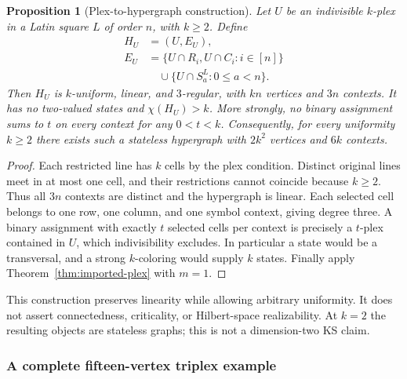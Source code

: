 \documentclass[aps,pra,reprint,superscriptaddress,longbibliography,nofootinbib,floatfix,10pt]{revtex4-2}
\newtheorem{proposition}[theorem]{Proposition}
\theoremstyle{definition}\newtheorem{definition}[theorem]{Definition}
\theoremstyle{remark}\newtheorem{remark}[theorem]{Remark}
\begin{document}
\begin{proposition}[Plex-to-hypergraph construction]\label{prop:plex-hypergraph}
Let $U$ be an indivisible $k$-plex in a Latin square $L$ of order $n$, with $k\ge2$. Define
\begin{equation}\label{eq:plex-contexts}
\begin{aligned}
H_U&=(U,E_U),\\
E_U&=\{U\cap R_i,U\cap C_i:i\in[n]\}\\
&\quad\cup\{U\cap S_a^L:0\le a<n\}.
\end{aligned}
\end{equation}
Then $H_U$ is $k$-uniform, linear, and $3$-regular, with $kn$ vertices and $3n$ contexts. It has no two-valued states and $\chi(H_U)>k$. More strongly, no binary assignment sums to $t$ on every context for any $0<t<k$. Consequently, for every uniformity $k\ge2$ there exists such a stateless hypergraph with $2k^2$ vertices and $6k$ contexts.
\end{proposition}
\begin{proof}
Each restricted line has $k$ cells by the plex condition. Distinct original lines meet in at most one cell, and their restrictions cannot coincide because $k\ge2$. Thus all $3n$ contexts are distinct and the hypergraph is linear. Each selected cell belongs to one row, one column, and one symbol context, giving degree three. A binary assignment with exactly $t$ selected cells per context is precisely a $t$-plex contained in $U$, which indivisibility excludes. In particular a state would be a transversal, and a strong $k$-coloring would supply $k$ states. Finally apply Theorem~\ref{thm:imported-plex} with $m=1$.
\end{proof}

This construction preserves linearity while allowing arbitrary uniformity. It does not assert connectedness, criticality, or Hilbert-space realizability. At $k=2$ the resulting objects are stateless graphs; this is not a dimension-two KS claim.

\subsubsection{A complete fifteen-vertex triplex example}
\end{document}
